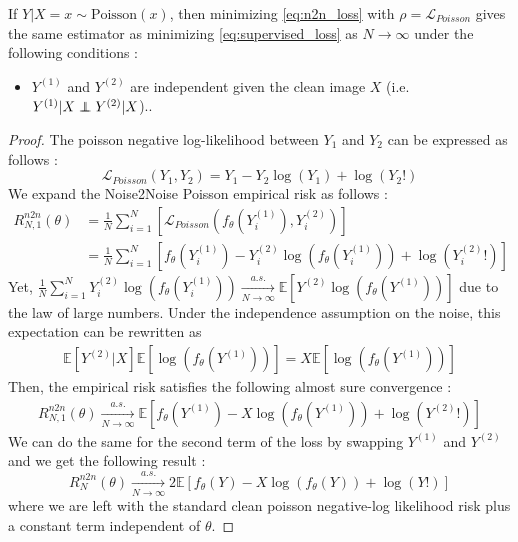 \begin{theorem}
    \label{th:noise2noise_poisson}
    If $Y | X=x \sim \text{Poisson}(x)$, then minimizing \ref{eq:n2n_loss} with $\rho = \mathcal{L}_{Poisson}$ gives the same estimator as minimizing \ref{eq:supervised_loss} as $N \to \infty$ under the following conditions :
    \begin{itemize}
        \item $Y^{(1)}$ and $Y^{(2)}$ are independent given the clean image $X$ (i.e. $Y^{(1)} | X \independent Y^{(2)} | X$)..
    \end{itemize}
\end{theorem}

\begin{proof}
    The poisson negative log-likelihood between $Y_1$ and $Y_2$ can be expressed as follows :
    \begin{equation*}
        \mathcal{L}_{Poisson}(Y_1, Y_2) = Y_1 - Y_2 \log(Y_1) + \log(Y_2!)
    \end{equation*}
    We expand the Noise2Noise Poisson empirical risk as follows :
    \begin{align*}
        R_{N,1}^{n2n}(\theta) &= \frac{1}{N} \sum_{i=1}^N \left[ \mathcal{L}_{Poisson}(f_\theta(Y_i^{(1)}), Y_i^{(2)}) \right] \\
        &= \frac{1}{N} \sum_{i=1}^N \left[ f_\theta(Y_i^{(1)}) - Y_i^{(2)} \log(f_\theta(Y_i^{(1)})) + \log(Y_i^{(2)}!) \right]
    \end{align*}
    Yet, $\frac{1}{N} \sum_{i=1}^N Y_i^{(2)} \log(f_\theta(Y_i^{(1)})) \xrightarrow[N \to \infty]{a.s.} \mathbb{E} \left[ Y^{(2)} \log(f_\theta(Y^{(1)})) \right]$ due to the law of large numbers. Under the independence assumption on the noise, this expectation can be rewritten as 
    \begin{align*}
        \mathbb{E} \left[ Y^{(2)} | X \right] \mathbb{E} \left[ \log(f_\theta(Y^{(1)})) \right] = X \mathbb{E} \left[ \log(f_\theta(Y^{(1)})) \right]
    \end{align*}
    Then, the empirical risk satisfies the following almost sure convergence :
    \begin{align*}
        R_{N,1}^{n2n}(\theta) \xrightarrow[N \to \infty]{a.s.} \mathbb{E} \left[ f_\theta(Y^{(1)}) - X \log(f_\theta(Y^{(1)})) + \log(Y^{(2)}!) \right]
    \end{align*}
    We can do the same for the second term of the loss by swapping $Y^{(1)}$ and $Y^{(2)}$ and we get the following result :
    \begin{equation*}
        R_{N}^{n2n}(\theta) \xrightarrow[N \to \infty]{a.s.} 2 \mathbb{E} \left[ f_\theta(Y) - X \log(f_\theta(Y)) + \log(Y!)\right]
    \end{equation*}
    where we are left with the standard clean poisson negative-log likelihood risk plus a constant term independent of $\theta$.
\end{proof}

